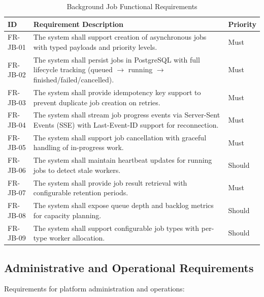 \begin{table}[htbp]
\centering
\caption{Background Job Functional Requirements}
\label{tab:fr-jobs}
\small
\begin{tabularx}{\textwidth}{|l|X|l|}
\hline
\textbf{ID} & \textbf{Requirement Description} & \textbf{Priority} \\
\hline
FR-JB-01 & The system shall support creation of asynchronous jobs with typed payloads and priority levels. & Must \\
\hline
FR-JB-02 & The system shall persist jobs in PostgreSQL with full lifecycle tracking (queued $\rightarrow$ running $\rightarrow$ finished/failed/cancelled). & Must \\
\hline
FR-JB-03 & The system shall provide idempotency key support to prevent duplicate job creation on retries. & Must \\
\hline
FR-JB-04 & The system shall stream job progress events via Server-Sent Events (SSE) with Last-Event-ID support for reconnection. & Must \\
\hline
FR-JB-05 & The system shall support job cancellation with graceful handling of in-progress work. & Must \\
\hline
FR-JB-06 & The system shall maintain heartbeat updates for running jobs to detect stale workers. & Should \\
\hline
FR-JB-07 & The system shall provide job result retrieval with configurable retention periods. & Must \\
\hline
FR-JB-08 & The system shall expose queue depth and backlog metrics for capacity planning. & Should \\
\hline
FR-JB-09 & The system shall support configurable job types with per-type worker allocation. & Should \\
\hline
\end{tabularx}
\end{table}

\subsection{Administrative and Operational Requirements}
\label{subsec:fr-admin}

Requirements for platform administration and operations:

